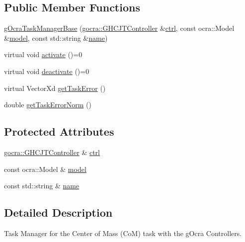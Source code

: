 \subsection*{Public Member Functions}
\begin{DoxyCompactItemize}
\item 
\hyperlink{classgocra_1_1gOcraTaskManagerBase_aeb3bde0cba73fbf7cf261f5293133f54}{g\+Ocra\+Task\+Manager\+Base} (\hyperlink{classgocra_1_1GHCJTController}{gocra\+::\+G\+H\+C\+J\+T\+Controller} \&\hyperlink{classgocra_1_1gOcraTaskManagerBase_a52d76d9b54d92f3d31faeaafda99e4c7}{ctrl}, const ocra\+::\+Model \&\hyperlink{classgocra_1_1gOcraTaskManagerBase_adc439e7170f7120611fc6d009d06404e}{model}, const std\+::string \&\hyperlink{classgocra_1_1gOcraTaskManagerBase_adfda0d31ecfa9afea1380f076a472f37}{name})
\item 
virtual void \hyperlink{classgocra_1_1gOcraTaskManagerBase_a50cf1c408749d6e9dcfaf50bcab77dee}{activate} ()=0
\item 
virtual void \hyperlink{classgocra_1_1gOcraTaskManagerBase_a7cf9111e69aee47a39fe0f2976a20d6c}{deactivate} ()=0
\item 
virtual Vector\+Xd \hyperlink{classgocra_1_1gOcraTaskManagerBase_a5c40a14b3a1d5a6519da422310d28f97}{get\+Task\+Error} ()
\item 
double \hyperlink{classgocra_1_1gOcraTaskManagerBase_ab38cda0adc96728270cc881d83644fda}{get\+Task\+Error\+Norm} ()
\end{DoxyCompactItemize}
\subsection*{Protected Attributes}
\begin{DoxyCompactItemize}
\item 
\hyperlink{classgocra_1_1GHCJTController}{gocra\+::\+G\+H\+C\+J\+T\+Controller} \& \hyperlink{classgocra_1_1gOcraTaskManagerBase_a52d76d9b54d92f3d31faeaafda99e4c7}{ctrl}
\item 
const ocra\+::\+Model \& \hyperlink{classgocra_1_1gOcraTaskManagerBase_adc439e7170f7120611fc6d009d06404e}{model}
\item 
const std\+::string \& \hyperlink{classgocra_1_1gOcraTaskManagerBase_adfda0d31ecfa9afea1380f076a472f37}{name}
\end{DoxyCompactItemize}


\subsection{Detailed Description}
Task Manager for the Center of Mass (CoM) task with the g\+Ocra Controllers. 



